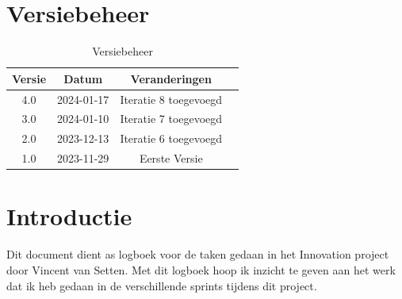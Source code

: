 \documentclass[a4paper]{report}
\begin{document}
\tableofcontents

\chapter{Versiebeheer}
\begin{table}[h]
    \centering
    \begin{tabular}{|c|c|c|p{5cm}|}
        \hline
        \textbf{Versie} & \textbf{Datum} & \textbf{Veranderingen}  \\
        \hline
        4.0   & 2024-01-17 & Iteratie 8 toegevoegd \\
        \hline
        3.0   & 2024-01-10 & Iteratie 7 toegevoegd \\
        \hline
        2.0   & 2023-12-13 & Iteratie 6 toegevoegd \\
        \hline
        1.0   & 2023-11-29 & Eerste Versie \\
        \hline

    \end{tabular}
    \caption{Versiebeheer}
\end{table}


\chapter{Introductie}
Dit document dient as logboek voor de taken gedaan in het Innovation project door Vincent van Setten.
Met dit logboek hoop ik inzicht te geven aan het werk dat ik heb gedaan in de verschillende sprints tijdens dit project.


\vspace{1.5cm}


\end{document}
